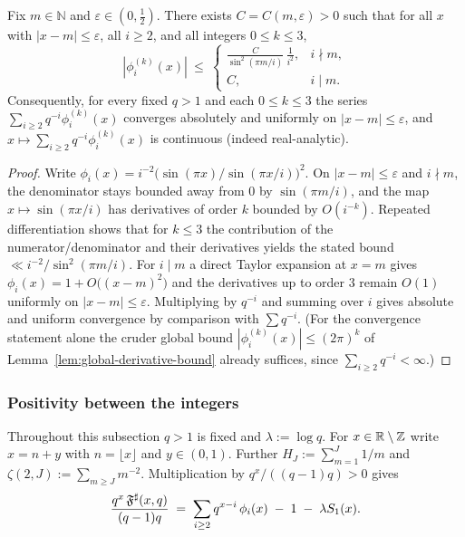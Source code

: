 \begin{lemma}\label{lem:uniform-summability}
Fix $m\in\mathbb N$ and $\varepsilon\in(0,\tfrac12)$. There exists $C=C(m,\varepsilon)>0$ such that for all $x$ with $|x-m|\le \varepsilon$, all $i\ge 2$, and all integers $0\le k\le 3$,
\[
|\phi_i^{(k)}(x)|\ \le\
\begin{cases}
\displaystyle \frac{C}{\sin^2(\pi m/i)}\,\frac{1}{i^{2}}, & i\nmid m,\\[1.2ex]
\displaystyle C, & i\mid m.
\end{cases}
\]
Consequently, for every fixed $q>1$ and each $0\le k\le 3$ the series $\sum_{i\ge2} q^{-i}\phi_i^{(k)}(x)$ converges absolutely and uniformly on $|x-m|\le \varepsilon$, and $x\mapsto \sum_{i\ge2} q^{-i}\phi_i^{(k)}(x)$ is continuous (indeed real-analytic).
\end{lemma}
\begin{proof}
Write $\phi_i(x)=i^{-2}\bigl(\sin(\pi x)/\sin(\pi x/i)\bigr)^2$. On $|x-m|\le \varepsilon$ and $i\nmid m$, the denominator stays bounded away from $0$ by $\sin(\pi m/i)$, and the map $x\mapsto \sin(\pi x/i)$ has derivatives of order $k$ bounded by $O(i^{-k})$. Repeated differentiation shows that for $k\le 3$ the contribution of the numerator/denominator and their derivatives yields the stated bound $\ll i^{-2}/\sin^2(\pi m/i)$. For $i\mid m$ a direct Taylor expansion at $x=m$ gives $\phi_i(x)=1+O\big((x-m)^2\big)$ and the derivatives up to order $3$ remain $O(1)$ uniformly on $|x-m|\le \varepsilon$. Multiplying by $q^{-i}$ and summing over $i$ gives absolute and uniform convergence by comparison with $\sum q^{-i}$. (For the convergence statement alone the cruder global bound $|\phi_i^{(k)}(x)|\le(2\pi)^k$ of Lemma~\ref{lem:global-derivative-bound} already suffices, since $\sum_{i\ge2}q^{-i}<\infty$.)
\end{proof}

\subsubsection{Positivity between the integers}
Throughout this subsection $q>1$ is fixed and $\lambda:=\log q$. For $x\in\mathbb{R}\setminus\mathbb{Z}$ write $x=n+y$ with $n=\lfloor x\rfloor$ and $y\in(0,1)$. Further $H_J:=\sum_{m=1}^{J}1/m$ and $\zeta(2,J):=\sum_{m\ge J}m^{-2}$. Multiplication by $q^{x}/((q-1)q)>0$ gives
\begin{equation}\label{eq:fsharp-scaled}
\frac{q^{x}\,\mathfrak F^{\sharp}(x,q)}{(q-1)q}\;=\;\sum_{i\ge2}q^{x-i}\,\phi_i(x)\;-\;1\;-\;\lambda S_1(x).
\end{equation}

